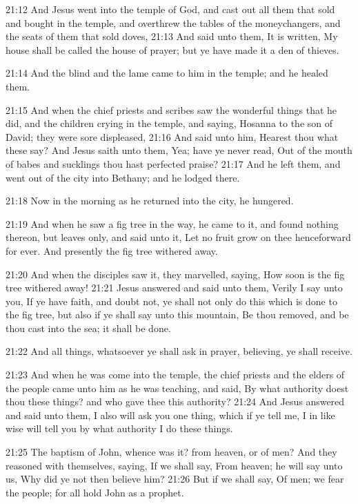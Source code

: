 21:12 And Jesus went into the temple of God, and cast out all them
that sold and bought in the temple, and overthrew the tables of the
moneychangers, and the seats of them that sold doves, 21:13 And said
unto them, It is written, My house shall be called the house of
prayer; but ye have made it a den of thieves.

21:14 And the blind and the lame came to him in the temple; and he
healed them.

21:15 And when the chief priests and scribes saw the wonderful things
that he did, and the children crying in the temple, and saying,
Hosanna to the son of David; they were sore displeased, 21:16 And said
unto him, Hearest thou what these say? And Jesus saith unto them, Yea;
have ye never read, Out of the mouth of babes and sucklings thou hast
perfected praise?  21:17 And he left them, and went out of the city
into Bethany; and he lodged there.

21:18 Now in the morning as he returned into the city, he hungered.

21:19 And when he saw a fig tree in the way, he came to it, and found
nothing thereon, but leaves only, and said unto it, Let no fruit grow
on thee henceforward for ever. And presently the fig tree withered
away.

21:20 And when the disciples saw it, they marvelled, saying, How soon
is the fig tree withered away!  21:21 Jesus answered and said unto
them, Verily I say unto you, If ye have faith, and doubt not, ye shall
not only do this which is done to the fig tree, but also if ye shall
say unto this mountain, Be thou removed, and be thou cast into the
sea; it shall be done.

21:22 And all things, whatsoever ye shall ask in prayer, believing, ye
shall receive.

21:23 And when he was come into the temple, the chief priests and the
elders of the people came unto him as he was teaching, and said, By
what authority doest thou these things? and who gave thee this
authority?  21:24 And Jesus answered and said unto them, I also will
ask you one thing, which if ye tell me, I in like wise will tell you
by what authority I do these things.

21:25 The baptism of John, whence was it? from heaven, or of men? And
they reasoned with themselves, saying, If we shall say, From heaven;
he will say unto us, Why did ye not then believe him?  21:26 But if we
shall say, Of men; we fear the people; for all hold John as a prophet.

